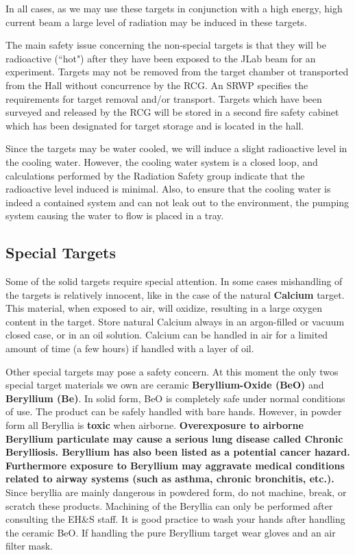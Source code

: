 In all cases, as we may use these targets in conjunction with a high
energy, high current beam a large level of radiation may be induced
in these targets.

The main safety issue concerning the non-special targets is that
they will be radioactive (``hot") after they have been
exposed to the JLab beam for an experiment.
Targets may not be removed from the target chamber ot transported from the Hall without 
concurrence by the RCG. An SRWP specifies the requirements for target removal and/or 
transport. Targets which have been surveyed and released by the RCG will be stored in a 
second fire safety cabinet which has been designated for target storage and is located in 
the hall.

Since the targets may be water cooled, we will induce a slight
radioactive level in the cooling water. However, the cooling water
system is a closed loop, and calculations performed by the Radiation
Safety group indicate that the radioactive level induced is minimal.
Also, to ensure that the cooling water is indeed a contained system
and can not leak out to the environment, the pumping system causing
the water to flow is placed in a tray.

\subsection{Special Targets}

Some of the solid targets require special attention. In some cases
mishandling of the targets is relatively innocent, like in the case
of the natural {\bf Calcium} target. This material, when exposed to air,
will oxidize, resulting in a large oxygen content in the target.
Store natural Calcium always in an argon-filled or vacuum closed
case, or in an oil solution. Calcium can be handled in air for a limited
amount of time (a few hours) if handled with a layer of oil.

Other special targets may pose a safety concern. At this
moment the only twos special target materials we own are ceramic
{\bf Beryllium-Oxide (BeO)} and {\bf Beryllium (Be)}.
In solid form, BeO is completely safe under normal conditions of use.
The product can be safely handled with bare hands.
However, in powder form all Beryllia is {\bf toxic} when airborne.
{\bf Overexposure to airborne Beryllium particulate may cause a
serious lung disease called Chronic Berylliosis. Beryllium has also
been listed as a potential cancer hazard. Furthermore exposure to
Beryllium may aggravate medical conditions related to airway systems
(such as asthma, chronic bronchitis, etc.).}
Since beryllia are mainly dangerous in powdered form, do not machine,
break, or scratch these products. Machining of the Beryllia can only
be performed after consulting the EH\&S staff.
It is good practice to wash your
hands after handling the ceramic BeO. If handling the pure Beryllium
target wear gloves and an air filter mask.

